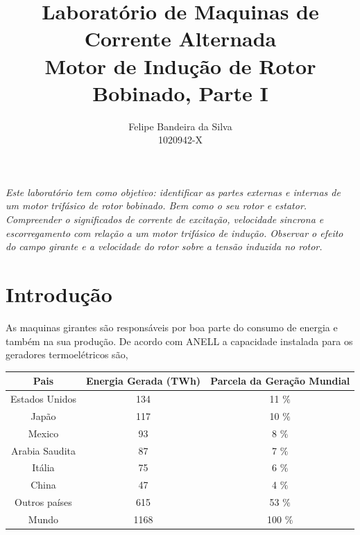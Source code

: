 \documentclass[paper=a4, fontsize=11pt]{article}
\title{Laboratório de Maquinas de Corrente Alternada\\
Motor de Indução de Rotor Bobinado, Parte I}
\author{Felipe Bandeira da Silva\\1020942-X}
\begin{document}
\maketitle


\textit{Este laboratório tem como objetivo: identificar 
as partes externas e internas de um motor trifásico de 
rotor bobinado. Bem como o seu rotor e estator. 
Compreender o significados de corrente de excitação, 
velocidade sincrona e escorregamento com relação a um 
motor trifásico de indução. Observar o efeito do 
campo girante e a velocidade do rotor sobre  a tensão
induzida no rotor.}

\newpage

\tableofcontents

\newpage



\newpage
\section{Introdução}
As maquinas girantes são responsáveis por boa parte
do consumo de energia e também na sua produção. De 
acordo com ANELL a capacidade instalada para os 
geradores termoelétricos são, 

\begin{center}
    \begin{tabular}{c|c|c}
        Pais & Energia Gerada (TWh) & Parcela da Geração Mundial \\
        \hline
        Estados Unidos & 134 & 11 $\%$ \\
        Japão & 117 & 10 $\%$ \\
        Mexico & 93 & 8 $\%$ \\
        Arabia Saudita & 87 & 7 $\%$ \\
        Itália & 75 & 6 $\%$ \\
        China & 47 & 4 $\%$ \\
        Outros países & 615 & 53 $\%$ \\
        Mundo & 1168 & 100 $\%$
    \end{tabular}
\end{center}
\end{document}
